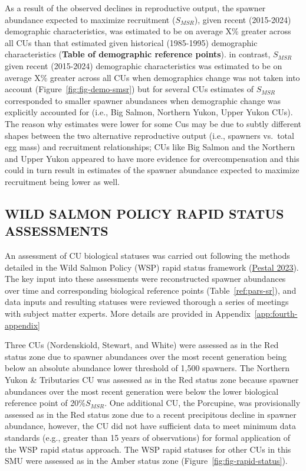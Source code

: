 \documentclass[11pt]{book}
\begin{document}
As a result of the observed declines in reproductive output, the spawner abundance expected to maximize recruitment (\(S_{MSR}\)), given recent (2015-2024) demographic characteristics, was estimated to be on average X\% greater across all CUs than that estimated given historical (1985-1995) demographic characteristics (\textbf{Table of demographic reference points}). in contrast, \(S_{MSR}\) given recent (2015-2024) demographic characteristics was estimated to be on average X\% greater across all CUs when demographics change was not taken into account (Figure~\ref{fig:fig-demo-smsr}) but for several CUs estimates of \(S_{MSR}\) corresponded to smaller spawner abundances when demographic change was explicitly accounted for (i.e., Big Salmon, Northern Yukon, Upper Yukon CUs). The reason why estimates were lower for some Cus may be due to subtly different shapes between the two alternative reproductive output (i.e., spawners vs.~total egg mass) and recruitment relationships; CUs like Big Salmon and the Northern and Upper Yukon appeared to have more evidence for overcompensation and this could in turn result in estimates of the spawner abundance expected to maximize recruitment being lower as well.

\hypertarget{wild-salmon-policy-rapid-status-assessments}{%
\subsection{WILD SALMON POLICY RAPID STATUS ASSESSMENTS}\label{wild-salmon-policy-rapid-status-assessments}}

An assessment of CU biological statuses was carried out following the methods detailed in the Wild Salmon Policy (WSP) rapid status framework (\protect\hyperlink{ref-pestal2023state}{Pestal 2023}). The key input into these assessments were reconstructed spawner abundances over time and corresponding biological reference points (Table~\ref{ref:pars-sr}), and data inputs and resulting statuses were reviewed thorough a series of meetings with subject matter experts. More details are provided in Appendix~\ref{app:fourth-appendix}

Three CUs (Nordenskiold, Stewart, and White) were assessed as in the Red status zone due to spawner abundances over the most recent generation being below an absolute abundance lower threshold of 1,500 spawners. The Northern Yukon \& Tributaries CU was assessed as in the Red status zone because spawner abundances over the most recent generation were below the lower biological reference point of 20\%\(S_{MSR}\). One additional CU, the Porcupine, was provisionally assessed as in the Red status zone due to a recent precipitous decline in spawner abundance, however, the CU did not have sufficient data to meet minimum data standards (e.g., greater than 15 years of observations) for formal application of the WSP rapid status approach. The WSP rapid statuses for other CUs in this SMU were assessed as in the Amber status zone (Figure~\ref{fig:fig-rapid-status}).
\end{document}
